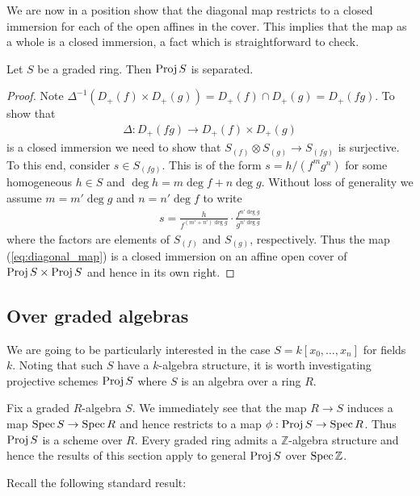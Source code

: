 \documentclass{article}
\begin{document}
We are now in a position show that the diagonal map restricts to a
closed immersion for each of the open affines in the cover. This
implies that the map as a whole is a closed immersion, a fact which
is straightforward to check.

\begin{theorem}\label{thm:separated}
  Let $S$ be a graded ring. Then $\operatorname{Proj} S$ is separated.
  \begin{proof}
    Note ${\Delta}^{-1}(D_+(f)\times D_+(g)) = D_+(f)\cap D_+(g) = D_+(fg)$.
    To show that
    \begin{align*}
      \Delta : D_+(fg) \to D_+(f)\times D_+(g)
    \end{align*}
    is a closed immersion we need to show that
    $S_{(f)}\otimes S_{(g)}\to S_{(fg)}$ is surjective. To this end,
    consider $s\in S_{(fg)}$. This is of the form
    $s=h/(f^m g^n)$ for some homogeneous $h\in S$ and
    $\deg h = m\deg f + n\deg g$. Without loss of generality we assume
    $m = m'\deg g$ and $n=n'\deg f$ to write
    \begin{align*}
      s = \frac{h}{f^{(m'+n')\deg g}} \cdot \frac{f^{n'\deg g}}{g^{n'\deg g}}
    \end{align*}
    where the factors are elements of $S_{(f)}$ and $S_{(g)}$,
    respectively. Thus the map (\ref{eq:diagonal_map}) is a closed
    immersion on an affine open cover of $\operatorname{Proj} S\times \operatorname{Proj} S$
    and hence in its own right.
  \end{proof}
\end{theorem}


\subsection{Over graded algebras}

We are going to be particularly interested in the case
$S = k[x_0,\ldots,x_n]$ for fields $k$. Noting that such $S$
have a $k$-algebra structure, it is worth investigating projective
schemes $\operatorname{Proj} S$ where $S$ is an algebra over a ring $R$.

Fix a graded $R$-algebra $S$. We immediately
see that the map $R\to S$ induces a map $\operatorname{Spec} S\to\operatorname{Spec} R$ and
hence restricts to a map $\phi:\operatorname{Proj} S\to\operatorname{Spec} R$. Thus $\operatorname{Proj} S$ is a
scheme over $R$. Every graded ring admits a
$\mathbb{Z}$-algebra structure and hence the results of this
section apply to general $\operatorname{Proj} S$ over $\operatorname{Spec}\mathbb{Z}$.

Recall the following standard result:
\end{document}

